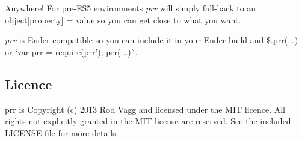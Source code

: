 Anywhere! For pre-\/\+E\+S5 environments {\itshape prr} will simply fall-\/back to an {\ttfamily object\mbox{[}property\mbox{]} = value} so you can get close to what you want.

{\itshape prr} is Ender-\/compatible so you can include it in your Ender build and {\ttfamily \$.prr(...)} or `var prr = require(\textquotesingle{}prr'); prr(...)\`{}.

\subsection*{Licence}

prr is Copyright (c) 2013 Rod Vagg \href{https://twitter.com/rvagg}{\tt } and licensed under the M\+IT licence. All rights not explicitly granted in the M\+IT license are reserved. See the included L\+I\+C\+E\+N\+SE file for more details. 